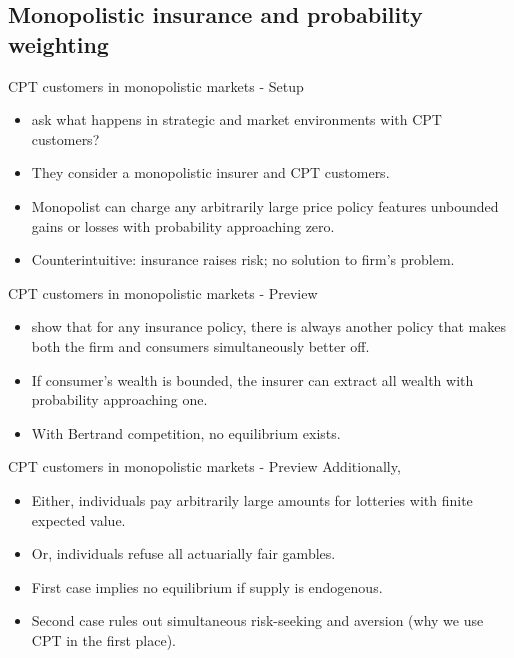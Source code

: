 

\subsection{Monopolistic insurance and probability weighting}
    \begin{frame}{CPT customers in monopolistic markets - Setup}
        \begin{itemize}
            \item \citet{AzevedoGottlieb2012} ask what happens in strategic and market environments with CPT customers?\bigskip
            \item They consider a monopolistic insurer and CPT customers.\bigskip
                \item Monopolist can charge any arbitrarily large price policy features unbounded gains or losses with probability approaching zero.\bigskip
                \item Counterintuitive: insurance raises risk; no solution to firm's problem.\medskip
        \end{itemize}
    \end{frame}

    \begin{frame}{CPT customers in monopolistic markets - Preview}
        \begin{itemize}
            \item \citet{AzevedoGottlieb2012} show that for any insurance policy, there is always another policy that makes both the firm and consumers simultaneously better off.\bigskip
            \item If consumer's wealth is bounded, the insurer can extract all wealth with probability approaching one.\bigskip
            \item With Bertrand competition, no equilibrium exists.\bigskip
        \end{itemize}
    \end{frame}



    \begin{frame}{CPT customers in monopolistic markets - Preview}
        Additionally,\medskip
           \begin{itemize}
               \item Either, individuals pay arbitrarily large amounts for lotteries with finite expected value.\bigskip
               \item Or, individuals refuse all actuarially fair gambles.\bigskip
               \item First case implies no equilibrium if supply is endogenous.\bigskip
               \item Second case rules out simultaneous risk-seeking and aversion (why we use CPT in the first place).\bigskip
           \end{itemize}
       \end{frame}

